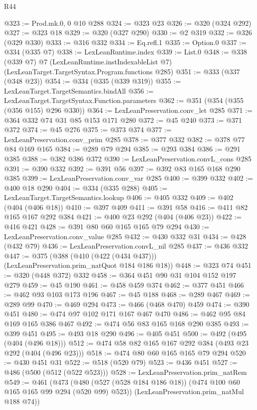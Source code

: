\begin{lexlean}{R44}
\begin{coremodule}
@323 := Prod.mk.{0, 0} @10 @288
@324 := @323 @23
@326 := @320 (@324 @292)
@327 := @323 @18
@329 := @320 (@327 @290)
@330 := @2 @319
@332 := @326 (@329 @330)
@333 := @316 @332
@334 := Eq.refl.{1}
@335 := Option.{0}
@337 := @334 (@335 @7)
@338 := LexLeanRuntime.index
@339 := List.{0}
@348 := @338
    (@339 @7)
    @7
    (LexLeanRuntime.instIndexableList @7)
    (LexLeanTarget.TargetSyntax.Program.functions @285)
@351 := @333 (@337 (@348 @23))
@354 := @334 (@335 (@339 @319))
@355 := LexLeanTarget.TargetSemantics.bindAll
@356 := LexLeanTarget.TargetSyntax.Function.parameters
@362 := @351 (@354 (@355 (@356 @155) @296 @330))
@364 := LexLeanPreservation.conv_let @285
@371 := @364 @332 @74 @31 @85 @153 @171 @280
@372 := @45 @240
@373 := @371 @372
@374 := @45 @276
@375 := @373 @374
@377 := LexLeanPreservation.conv_prim @285
@378 := @377 @332
@382 := @378 @77 @84 @169 @165
@384 := @289 @79 @294
@385 := @293 @384
@386 := @291 @385
@388 := @382 @386 @372
@390 := LexLeanPreservation.convL_cons @285
@391 := @390 @332
@392 := @391 @56
@397 := @392 @83 @165 @168 @290 @385
@399 := LexLeanPreservation.conv_var @285
@400 := @399 @332
@402 := @400 @18 @290
@404 := @334 (@335 @288)
@405 := LexLeanTarget.TargetSemantics.lookup
@406 := @405 @332
@409 := @402 (@404 (@406 @18))
@410 := @397 @409
@411 := @391 @58
@416 := @411 @82 @165 @167 @292 @384
@421 := @400 @23 @292 (@404 (@406 @23))
@422 := @416 @421
@428 := @391 @80 @60 @165 @165 @79 @294
@430 := LexLeanPreservation.conv_value @285
@432 := @430 @332 @31
@434 := @428 (@432 @79)
@436 := LexLeanPreservation.convL_nil @285
@437 := @436 @332
@447 := @375 (@388 (@410 (@422 (@434 @437))) (LexLeanPreservation.prim_natQuot @184 @186 @18))
@448 := @323 @74
@451 := @320 (@448 @372) @332
@458 := @364 @451 @90 @31 @104 @152 @197 @279
@459 := @45 @190
@461 := @458 @459 @374
@462 := @377 @451
@466 := @462 @93 @103 @173 @196
@467 := @45 @188
@468 := @289 @467
@469 := @289 @99
@470 := @469 @294
@473 := @466 (@468 @470) @459
@474 := @390 @451
@480 := @474 @97 @102 @171 @167 @467 @470
@486 := @462 @95 @84 @169 @165 @386 @467
@492 := @474 @56 @83 @165 @168 @290 @385
@493 := @399 @451
@495 := @493 @18 @290
@496 := @405 @451
@500 := @492 (@495 (@404 (@496 @18)))
@512 := @474 @58 @82 @165 @167 @292 @384 (@493 @23 @292 (@404 (@496 @23)))
@518 := @474 @80 @60 @165 @165 @79 @294
@520 := @430 @451 @31
@522 := @518 (@520 @79)
@523 := @436 @451
@527 := @486 (@500 (@512 (@522 @523)))
@528 := LexLeanPreservation.prim_natRem
@549 := @461
    (@473
      (@480 (@527 (@528 @184 @186 @18)) (@474 @100 @60 @165 @165 @99 @294 (@520 @99) @523))
      (LexLeanPreservation.prim_natMul @188 @74))

\end{coremodule}
\end{lexlean}
